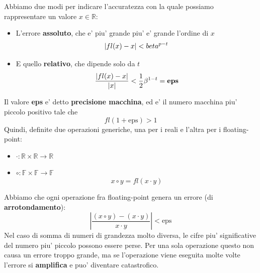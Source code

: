 Abbiamo due modi per indicare l'accuratezza con la quale possiamo rappresentare un valore $ x \in \mathbb{R} $:
\begin{itemize}
\item L'errore \textbf{assoluto}, che e' piu' grande piu' e' grande l'ordine di $ x $
  \[
    |fl(x)-x|<\\beta^{p-t}
  \]
\item E quello \textbf{relativo}, che dipende solo da $ t $
  \[
    \frac{|fl(x)-x|}{|x|} < \frac{1}{2}\beta^{1-t} = \text{\textbf{eps}}
  \]
\end{itemize}
Il valore \textbf{eps} e' detto \textbf{precisione macchina}, ed e' il numero macchina piu' piccolo positivo tale che
\[
  fl(1+\text{eps}) > 1
\]
Quindi, definite due operazioni generiche, una per i reali e l'altra per i floating-point:
\begin{itemize}
\item $ \cdot: \mathbb{R} \times \mathbb{R} \to \mathbb{R} $
\item $ \circ: \mathbb{F} \times \mathbb{F} \to \mathbb{F} $
  \[
    x \circ y = fl(x \cdot y)
  \]
\end{itemize}
Abbiamo che ogni operazione fra floating-point genera un errore (di \textbf{arrotondamento}):
\[
  \left|\frac{(x \circ y) - (x \cdot y)}{x \cdot y}\right| < \text{eps}
\]  
Nel caso di somma di numeri di grandezza molto diversa, le cifre piu' significative del numero piu' piccolo possono essere perse. Per una sola operazione questo non causa un errore troppo grande, ma se l'operazione viene eseguita molte volte l'errore si \textbf{amplifica} e puo' diventare catastrofico.

